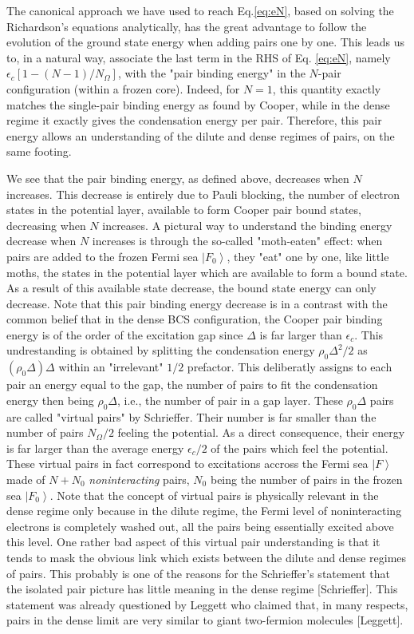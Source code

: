 \documentclass[aps,prb,superscriptaddress,twocolumn]{revtex4}
\begin{document}
The canonical approach we have used to reach Eq.\eqref{eq:eN}, based on solving the
Richardson's equations analytically, has the great advantage to follow the evolution of the
ground state energy when adding pairs one by one. This leads us to, in a natural way, associate the last term in the RHS of Eq.%
\eqref{eq:eN}, namely $\epsilon _{c}\left[ 1-\left( N-1\right) /N_{\Omega }%
\right] $, with the "pair binding energy" in the $N$-pair configuration
(within a frozen core). Indeed, for $N=1$, this quantity exactly matches the
single-pair binding energy as found by Cooper, while in the dense regime it exactly
gives the condensation energy per pair. Therefore, this pair energy
allows an understanding of the dilute and dense regimes of pairs, on the same footing.

We see that the pair binding energy, as defined
above, decreases when $N$ increases. This decrease is entirely due to
Pauli blocking, the number of electron states in
the potential layer, available to form Cooper pair bound states, decreasing when $N$ increases. 
A pictural way to
understand the binding energy decrease when $N$ increases is through the
so-called "moth-eaten" effect: when pairs are added to the frozen Fermi sea $\left\vert
F_{0}\right\rangle $, they "eat" one by one, like little moths, the
states in the potential layer which are available to form a bound state. As
a result of this available state decrease, the bound state energy can only
decrease. Note that this pair binding energy decrease is in a contrast with
the common belief that in the dense BCS configuration, the Cooper pair
binding energy is of the order of the excitation gap since  $\Delta $ is far larger
than $\epsilon _{c}$. This undrestanding is obtained by splitting the
condensation energy $\rho _{0}\Delta ^{2}/2$ as $(\rho _{0}\Delta )\Delta $
within an "irrelevant" $1/2$ prefactor. This deliberatly assigns to each pair an
energy equal to the gap, the number of pairs to fit the condensation energy
then being $\rho _{0}\Delta $, i.e., the number of pair in a gap layer. These $\rho
_{0}\Delta $ pairs are called "virtual pairs" by Schrieffer.
Their number is far smaller than the number of pairs $N_{\Omega }/2$ feeling
the potential. As a direct consequence, their energy is far larger than the average energy $%
\epsilon _{c}/2$ of the pairs which feel the potential. These virtual pairs in fact correspond
to excitations accross the Fermi sea $\left\vert F\right\rangle $ made of $%
N+N_{0}$ \textit{noninteracting} pairs, $N_{0}$ being the number of pairs in
the frozen sea $\left\vert F_{0}\right\rangle $. Note that the concept of virtual
pairs is physically relevant in the dense regime only because in the
dilute regime, the Fermi level of noninteracting electrons is completely
washed out, all the pairs being essentially excited above this level.
One rather bad aspect of this virtual pair understanding is that it tends to mask the obvious link which exists between the dilute and dense regimes of pairs. This probably is one of the reasons for the Schrieffer's statement that the
isolated pair picture has little meaning in the dense regime
[Schrieffer]. This statement was already questioned by Leggett who
claimed that, in many respects, pairs in the dense limit are very similar to giant two-fermion
molecules [Leggett]. 
\end{document}
